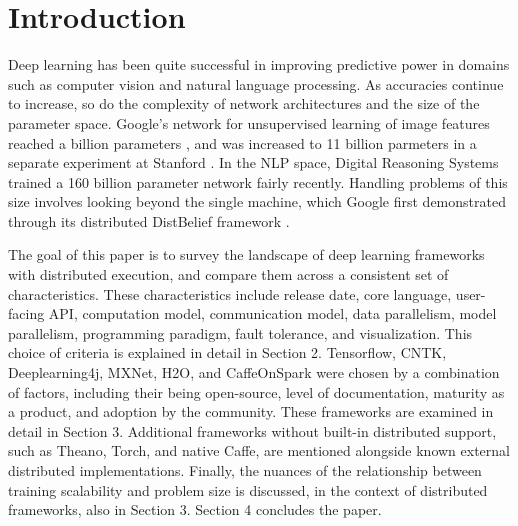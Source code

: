 \section{Introduction}
Deep learning has been quite successful in improving predictive power in domains such as computer vision and natural language processing. As accuracies continue to  increase, so do the complexity of network architectures and the size of the parameter space. Google's network for unsupervised learning of image features reached a billion parameters \cite{donahue2014decaf}, and was increased to 11 billion parmeters in a separate experiment at Stanford \cite{schmidhuber2015deep}. In the NLP space, Digital Reasoning Systems trained a 160 billion parameter network \cite{trask2015modeling} fairly recently. Handling problems of this size involves looking beyond the single machine, which Google first demonstrated through its distributed DistBelief framework \cite{dean2012large}.

The goal of this paper is to survey the landscape of deep learning frameworks with distributed execution, and compare them across a consistent set of characteristics. These characteristics include release date, core language, user-facing API, computation model, communication model, data parallelism, model parallelism, programming paradigm, fault tolerance, and visualization. This choice of criteria is explained in detail in Section 2. Tensorflow, CNTK, Deeplearning4j, MXNet, H2O, and CaffeOnSpark were chosen by a combination of factors, including their being open-source, level of documentation, maturity as a product, and adoption by the community. These frameworks are examined in detail in Section 3. Additional frameworks without built-in distributed support, such as Theano, Torch, and native Caffe, are mentioned alongside known external distributed implementations. Finally, the nuances of the relationship between training scalability and problem size is discussed, in the context of distributed frameworks, also in Section 3. Section 4 concludes the paper. 
